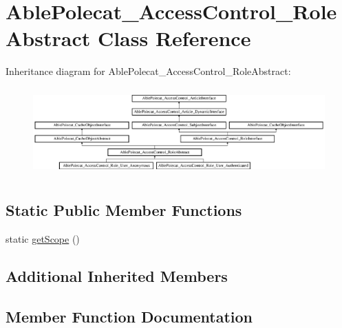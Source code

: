 \hypertarget{class_able_polecat___access_control___role_abstract}{}\section{Able\+Polecat\+\_\+\+Access\+Control\+\_\+\+Role\+Abstract Class Reference}
\label{class_able_polecat___access_control___role_abstract}
Inheritance diagram for Able\+Polecat\+\_\+\+Access\+Control\+\_\+\+Role\+Abstract\+:\begin{figure}[H]
\begin{center}
\leavevmode
\includegraphics[height=3.414634cm]{class_able_polecat___access_control___role_abstract}
\end{center}
\end{figure}
\subsection*{Static Public Member Functions}
\begin{DoxyCompactItemize}
\item 
static \hyperlink{class_able_polecat___access_control___role_abstract_ad9ade868bd136d32967059d1cccb3e92}{get\+Scope} ()
\end{DoxyCompactItemize}
\subsection*{Additional Inherited Members}


\subsection{Member Function Documentation}
\hypertarget{class_able_polecat___access_control___role_abstract_ad9ade868bd136d32967059d1cccb3e92}{}
